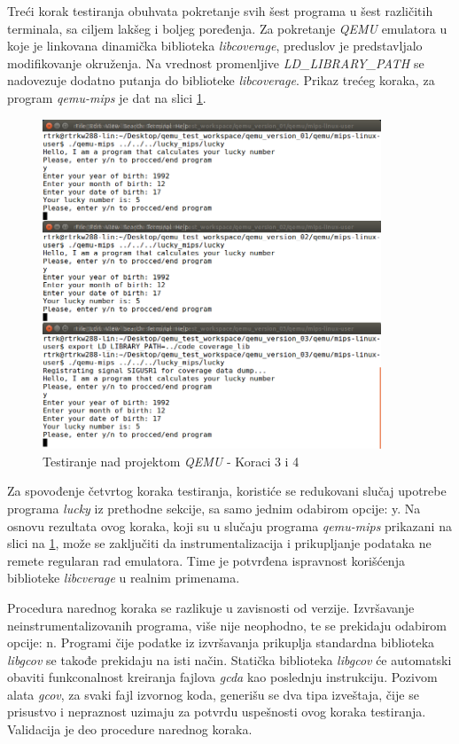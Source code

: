 \documentclass[12pt,oneside]{memoir}
\newcommand{\strano}[1]{\textit{#1}}
\begin{document}
Treći korak testiranja obuhvata pokretanje svih šest programa u šest različitih terminala, sa ciljem lakšeg i boljeg poređenja.  Za pokretanje \strano{QEMU} emulatora u koje je linkovana dinamička biblioteka \strano{libcoverage}, preduslov je predstavljalo modifikovanje okruženja. Na vrednost promenljive \strano{LD\_LIBRARY\_PATH} se nadovezuje dodatno putanja do biblioteke \strano{libcoverage}. Prikaz trećeg koraka, za program \strano{qemu-mips} je dat na slici \ref{fig:qemu-test-34}.


\begin{figure}[!ht]
  \centering
  \includegraphics[width=0.9\textwidth]{img/qemu-test-23-ng.png}
  \caption{Testiranje nad projektom \strano{QEMU} - Koraci 3 i 4}
  \label{fig:qemu-test-34}
\end{figure} 

Za spovođenje četvrtog koraka testiranja, koristiće se redukovani slučaj upotrebe programa \strano{lucky} iz prethodne sekcije, sa samo jednim odabirom opcije: y. Na osnovu rezultata ovog koraka, koji su u slučaju programa \strano{qemu-mips} prikazani na slici na \ref{fig:qemu-test-34}, može se zaključiti da instrumentalizacija i prikupljanje podataka ne remete regularan rad emulatora. Time je potvrđena ispravnost korišćenja biblioteke \strano{libcverage} u realnim primenama. 

Procedura narednog koraka se razlikuje u zavisnosti od verzije. Izvršavanje neinstrumentalizovanih programa, više nije neophodno, te se prekidaju odabirom opcije: n. Programi čije podatke iz izvršavanja prikuplja standardna biblioteka \strano{libgcov} se takođe prekidaju na isti način. Statička biblioteka \strano{libgcov} će automatski obaviti funkconalnost kreiranja fajlova \strano{gcda} kao poslednju instrukciju. Pozivom alata \strano{gcov}, za svaki fajl izvornog koda, generišu se dva tipa izveštaja, čije se prisustvo i nepraznost uzimaju za potvrdu uspešnosti ovog koraka testiranja. Validacija je deo procedure narednog koraka. 
\end{document}
